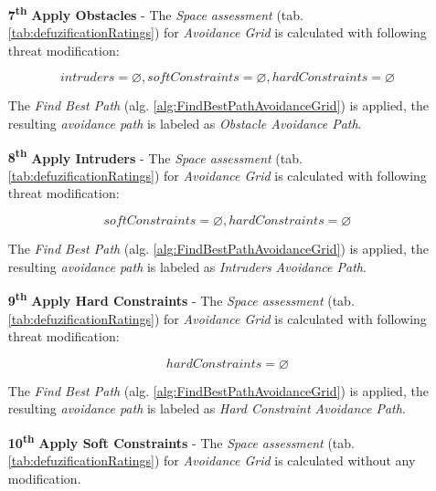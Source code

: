 \begin{itemize}
    
    \item[\textbf{7\textsuperscript{th}}] \textbf{Apply Obstacles} - The \emph{Space assessment} (tab. \ref{tab:defuzificationRatings}) for \emph{Avoidance Grid} is calculated  with following threat modification:
    
    \begin{equation*}
        intruders = \varnothing, soft Constraints = \varnothing, hard Constraints = \varnothing
    \end{equation*}
    
    The \emph{Find Best Path} (alg. \ref{alg:FindBestPathAvoidanceGrid}) is applied, the resulting \emph{avoidance path} is labeled as \emph{Obstacle Avoidance Path}.
  
    \item[\textbf{8\textsuperscript{th}}] \textbf{Apply Intruders} - The \emph{Space assessment} (tab. \ref{tab:defuzificationRatings}) for \emph{Avoidance Grid} is calculated  with following threat modification:
    
    \begin{equation*}
        soft Constraints = \varnothing, hard Constraints = \varnothing
    \end{equation*}
    
    The \emph{Find Best Path} (alg. \ref{alg:FindBestPathAvoidanceGrid}) is applied, the resulting \emph{avoidance path} is labeled as \emph{Intruders Avoidance Path}.
    
    \item[\textbf{9\textsuperscript{th}}] \textbf{Apply Hard Constraints} - The \emph{Space assessment} (tab. \ref{tab:defuzificationRatings}) for \emph{Avoidance Grid} is calculated  with following threat modification:
    
    \begin{equation*}
        hard Constraints = \varnothing
    \end{equation*}
    
    The \emph{Find Best Path} (alg. \ref{alg:FindBestPathAvoidanceGrid}) is applied, the resulting \emph{avoidance path} is labeled as \emph{Hard Constraint Avoidance Path}.
    
    \item[\textbf{10\textsuperscript{th}}] \textbf{Apply Soft Constraints} - The \emph{Space assessment} (tab. \ref{tab:defuzificationRatings}) for \emph{Avoidance Grid} is calculated  without any modification.
    

\end{itemize}
